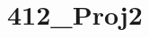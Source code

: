 \chapter{412\+\_\+\+Proj2}
\hypertarget{md__r_e_a_d_m_e}{}\label{md__r_e_a_d_m_e}
\label{md__r_e_a_d_m_e_autotoc_md0}%
%

